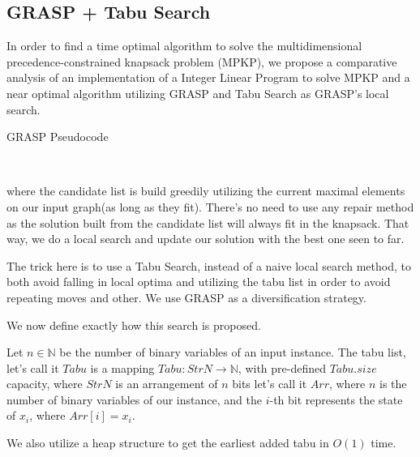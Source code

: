 \subsection{GRASP + Tabu Search}

In order to find a time optimal algorithm to solve the multidimensional precedence-constrained knapsack problem (MPKP), we propose a comparative analysis of an implementation of a Integer Linear Program to solve MPKP and a near optimal algorithm utilizing GRASP and Tabu Search as GRASP's local search.

\begin{algorithm}[ht!]
    \caption{GRASP Pseudocode}
    \begin{algorithmic}[1]
            \EndIf
        \EndFor
        \\
    \end{algorithmic}
\end{algorithm}
where the candidate list is build greedily utilizing the current maximal elements on our input graph(as long as they fit).
There's no need to use any repair method as the solution built from the candidate list will always fit in the knapsack.
That way, we do a local search and update our solution with the best one seen to far.

The trick here is to use a Tabu Search, instead of a naive local search method, to both avoid falling in local optima and utilizing the tabu list in order to avoid repeating moves and other. We use GRASP as a diversification strategy.

We now define exactly how this search is proposed.

Let $n \in \mathbb N$ be the number of binary variables of an input instance. The tabu list, let's call it $Tabu$ is a mapping $Tabu : StrN \rightarrow \mathbb N$, with pre-defined $Tabu.size$ capacity, where $StrN$ is an arrangement of $n$ bits let's call it $Arr$, where $n$ is the number of binary variables of our instance, and the $i$-th bit represents the state of $x_i$, where $Arr[i] = x_i$.

We also utilize a heap structure to get the earliest added tabu in $O(1)$ time.

